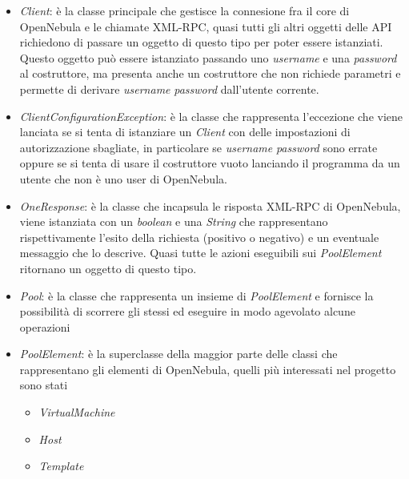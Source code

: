 \begin{itemize}
    \item \emph{Client}: è la classe principale che gestisce la connesione fra il core di OpenNebula e le chiamate XML-RPC, quasi tutti gli altri oggetti delle API richiedono di passare un oggetto di questo tipo per poter essere istanziati. Questo oggetto può essere istanziato passando uno \emph{username} e una \emph{password} al costruttore, ma presenta anche un costruttore che non richiede parametri e permette di derivare \emph{username} \emph{password} dall'utente corrente.
    \item \emph{ClientConfigurationException}: è la classe che rappresenta l'eccezione che viene lanciata se si tenta di istanziare un \emph{Client} con delle impostazioni di autorizzazione sbagliate, in particolare se \emph{username} \emph{password} sono errate oppure se si tenta di usare il costruttore vuoto lanciando il programma da un utente che non è uno user di OpenNebula.
    \item \emph{OneResponse}: è la classe che incapsula le risposta XML-RPC di OpenNebula, viene istanziata con un \emph{boolean} e una \emph{String} che rappresentano rispettivamente l'esito della richiesta (positivo o negativo) e un eventuale messaggio che lo descrive. Quasi tutte le azioni eseguibili sui \emph{PoolElement} ritornano un oggetto di questo tipo.
    \item \emph{Pool}: è la classe che rappresenta un insieme di \emph{PoolElement} e fornisce la possibilità di scorrere gli stessi ed eseguire in modo agevolato alcune operazioni
    \item \emph{PoolElement}: è la superclasse della maggior parte delle classi che rappresentano gli elementi di OpenNebula, quelli più interessati nel progetto sono stati
          \begin{itemize}
              \item \emph{VirtualMachine}
              \item \emph{Host}
              \item \emph{Template}
          \end{itemize}
\end{itemize}

